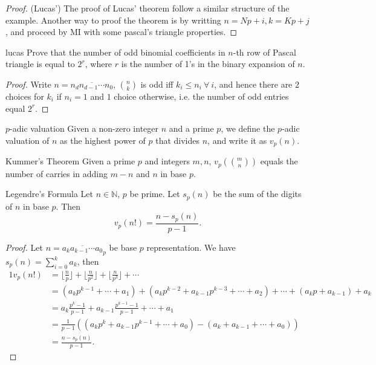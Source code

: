 \begin{proof}(Lucas')
    The proof of Lucas' theorem follow a similar structure of the example. Another way to proof the theorem is by writting $n=Np+i, k=Kp+j$, and proceed by MI with some pascal's triangle properties.
\end{proof}

\begin{example}[exp:]{lucas}
Prove that the number of odd binomial coefficients in
$n$-th row of Pascal triangle is equal to $2^r$,
where $r$ is the number of 1's in the binary expansion of $n$.
\begin{proof}
    Write $n=\overline{n_dn_{d-1}\cdots n_0}$, ${n\choose k}$ is odd iff $k_i\leq n_i\ \forall\ i$, and hence there are $2$ choices for $k_i$ if $n_i=1$ and $1$ choice otherwise, i.e. the number of odd entries equal $2^r$.
\end{proof}
\end{example}

\begin{definition}[def:]{$p$-adic valuation}
    Given a non-zero integer $n$ and a prime $p$, we define the $p$-adic valuation of $n$ as the highest power of $p$ that divides $n$, and write it as $v_p(n)$.
\end{definition}

\begin{theorem}[thm:]{Kummer's Theorem}
    Given a prime $p$ and integers $m,n$, $v_p\left({m\choose n}\right)$ equals the number of carries in adding $m-n$ and $n$ in base $p$. 
\end{theorem}

\begin{theorem}[thm:]{Legendre's Formula}
    Let $n\in \mathbb{N}$, $p$ be prime. Let $s_p(n)$ be the sum of the digits of $n$ in base $p$. Then
    \[v_p(n!)=\frac{n-s_p(n)}{p-1}.\]
    \begin{proof}
        Let $n=\overline{a_ka_{k-1}\cdots a_0}_p$ be base $p$ representation. We have $s_p(n)=\sum_{i=0}^{k}a_k$, then
        \begin{alignat*}{1}
            v_p(n!)
            &= \lfloor\frac{n}{p}\rfloor + \lfloor\frac{n}{p^2}\rfloor + \lfloor\frac{n}{p^3}\rfloor + \cdots \\
            &= (a_kp^{k-1}+\cdots +a_1) + (a_kp^{k-2}+a_{k-1}p^{k-3}+\cdots +a_2)+\cdots +(a_kp+a_{k-1})+a_k\\
            &= a_k\frac{p^k-1}{p-1}+a_{k-1}\frac{p^{k-1}-1}{p-1}+\cdots +a_1\\
            &= \frac{1}{p-1}\left((a_kp^k+a_{k-1}p^{k-1}+\cdots +a_0) - (a_k+a_{k-1}+\cdots +a_0)\right)\\
            &= \frac{n-s_p(n)}{p-1}.
        \end{alignat*}
    \end{proof}
\end{theorem}

